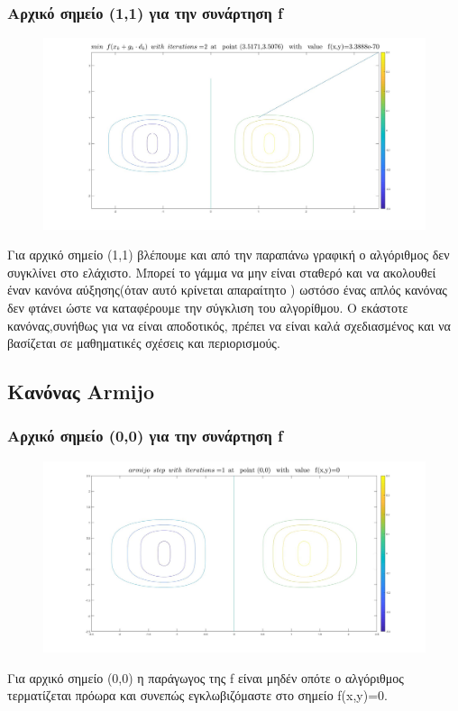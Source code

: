 \documentclass{article}
\begin{document}
\subsubsection*{Αρχικό σημείο (1,1) για την συνάρτηση f}
\begin{figure}[h!]	
     \centering  
     \advance\leftskip-0.2cm  
  \includegraphics[width=130mm,scale=2]{ml3.jpg}
\end{figure} 
Για αρχικό σημείο (1,1) βλέπουμε και από την παραπάνω γραφική ο αλγόριθμος  δεν συγκλίνει στο ελάχιστο. Μπορεί το γάμμα  να μην είναι σταθερό και να ακολουθεί έναν κανόνα αύξησης(όταν αυτό κρίνεται απαραίτητο ) ωστόσο ένας απλός κανόνας δεν φτάνει ώστε να καταφέρουμε την σύγκλιση του αλγορίθμου. Ο εκάστοτε κανόνας,συνήθως για να είναι αποδοτικός, πρέπει να είναι καλά σχεδιασμένος και να βασίζεται σε μαθηματικές σχέσεις και περιορισμούς. 
\clearpage
 \subsection*{Κανόνας Armijo}
\subsubsection*{Αρχικό σημείο (0,0) για την συνάρτηση f}
\begin{figure}[h!]	
     \centering  
     \advance\leftskip-0.2cm  
  \includegraphics[width=130mm,scale=2]{arm1.jpg}
\end{figure} 
Για αρχικό σημείο (0,0) η παράγωγος της f είναι μηδέν οπότε ο αλγόριθμος τερματίζεται πρόωρα και συνεπώς εγκλωβιζόμαστε στο σημείο f(x,y)=0.
\end{document}
